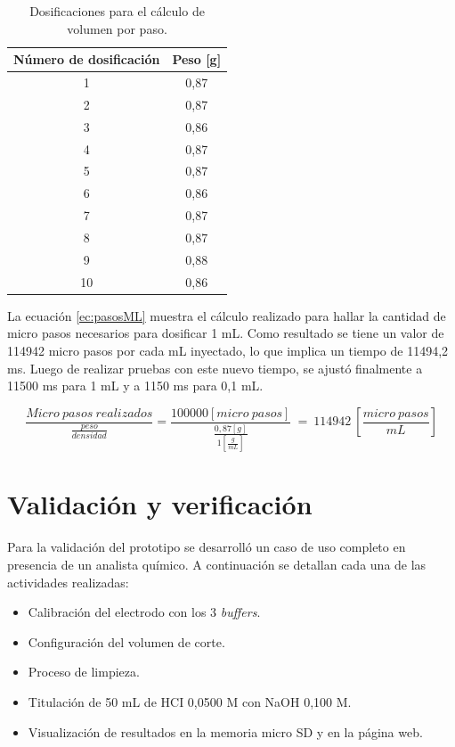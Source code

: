 \begin{table}[h]
	\centering
	\caption[Dosificaciones]{Dosificaciones para el cálculo de volumen por paso.}
	\begin{tabular}{c c }    
		\toprule
		\textbf{Número de dosificación} & \textbf{Peso [g] } \\
		\midrule
		1 	& 0,87 \\	
		2	& 0,87 \\
		3	& 0,86 \\
		4	& 0,87 \\
		5	& 0,87 \\
		6	& 0,86 \\
		7	& 0,87 \\
		8	& 0,87 \\
		9	& 0,88 \\
		10	& 0,86 \\
		\bottomrule
		\hline
	\end{tabular}
	\label{tab:ensayoBomba}
\end{table}

La ecuación \ref{ec:pasosML} muestra el cálculo realizado para hallar la cantidad de micro pasos necesarios para dosificar 1 mL. Como resultado se tiene un valor de 114942 micro pasos por cada mL inyectado, lo que implica un tiempo de 11494,2 ms. Luego de realizar pruebas con este nuevo tiempo, se ajustó finalmente a 11500 ms para 1 mL y a 1150 ms para 0,1 mL.

\begin{equation}
\frac{Micro\:pasos\:realizados}{\frac{peso}{densidad}} = \frac{100000 [micro\:pasos]}{\frac{0,87 [g]}{1[\frac{g}{mL}]}}\:=\:114942 \:[\frac{micro\:pasos}{mL}]
\label{ec:pasosML}
\end{equation}

\vspace{1,5 cm}


\section{Validación y verificación}
\label{sec:validacionVerificacion}

Para la validación del prototipo se desarrolló un caso de uso completo en presencia de un analista químico. A continuación se detallan cada una de las actividades realizadas:
\begin{itemize}
	\item Calibración del electrodo con los 3 \textit{buffers}.
	\item Configuración del volumen de corte.
	\item Proceso de limpieza.
	\item Titulación de 50 mL de HCI 0,0500 M con NaOH 0,100 M.
	\item Visualización de resultados en la memoria micro SD y en la página web.
\end{itemize}

